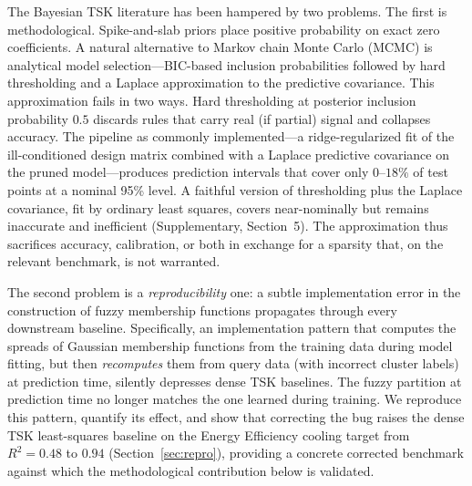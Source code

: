 \documentclass[review,1p,times]{elsarticle}
\begin{document}
The Bayesian TSK literature has been hampered by two problems. The first is methodological.
Spike-and-slab priors \cite{mitchell1988bayesian,george1993variable} place positive probability on exact zero coefficients.
A natural alternative to Markov chain Monte Carlo (MCMC) is analytical model selection---BIC-based inclusion probabilities followed by hard thresholding and a Laplace approximation to the predictive covariance. This approximation fails in two ways.
Hard thresholding at posterior inclusion probability $0.5$ discards rules that carry real (if partial) signal and collapses accuracy.
The pipeline as commonly implemented---a ridge-regularized fit of the ill-conditioned design matrix combined with a Laplace predictive covariance on the pruned model---produces prediction intervals that cover only $0$--$18\%$ of test points at a nominal 95\% level. A faithful version of thresholding plus the Laplace covariance, fit by ordinary least squares, covers near-nominally but remains inaccurate and inefficient (Supplementary, Section~5). The approximation thus sacrifices accuracy, calibration, or both in exchange for a sparsity that, on the relevant benchmark, is not warranted.

The second problem is a \emph{reproducibility} one: a subtle implementation error in the construction of fuzzy membership functions propagates through every downstream baseline.
Specifically, an implementation pattern that computes the spreads of Gaussian membership functions from the training data during model fitting, but then \emph{recomputes} them from query data (with incorrect cluster labels) at prediction time, silently depresses dense TSK baselines.
The fuzzy partition at prediction time no longer matches the one learned during training. We reproduce this pattern, quantify its effect, and show that correcting the bug raises the dense TSK least-squares baseline on the Energy Efficiency cooling target from $R^2=0.48$ to $0.94$ (Section~\ref{sec:repro}), providing a concrete corrected benchmark against which the methodological contribution below is validated.
\end{document}
